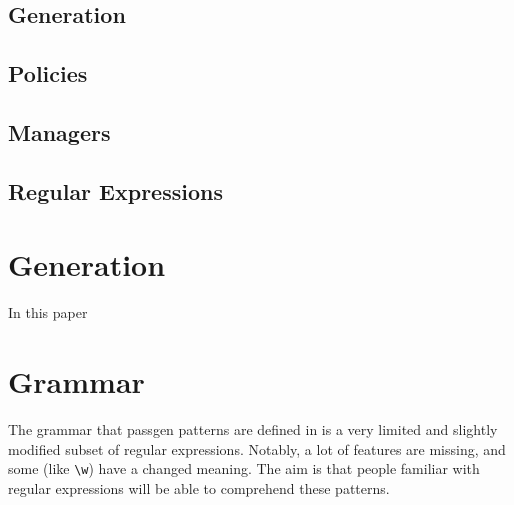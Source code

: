 \documentclass[a4paper,twocolumn]{article}
\begin{document}

\subsection{Generation}


\subsection{Policies}


\subsection{Managers}






\subsection{Regular Expressions}

\section{Generation}

In this paper

\section{Grammar}

The grammar that passgen patterns are defined in is a very limited and slightly modified subset of regular expressions. Notably, a lot of features are missing, and some (like \verb|\w|) have a changed meaning. The aim is that people familiar with regular expressions will be able to comprehend these patterns.
\end{document}
